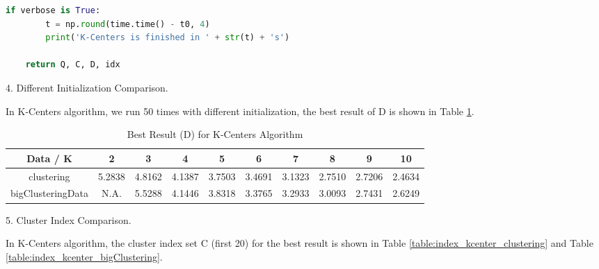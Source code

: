 \begin{description}
\begin{description}
\begin{lstlisting}[language=Python, caption=K-Centers Algorithm Python Code]
    if verbose is True:
        t = np.round(time.time() - t0, 4)
        print('K-Centers is finished in ' + str(t) + 's')

    return Q, C, D, idx
\end{lstlisting}

\item{4.} Different Initialization Comparison.

In K-Centers algorithm, we run 50 times with different initialization, the best result of D is shown in Table \ref{table:best_kcenter}.

\begin{table}[H]
	\centering
	\caption{Best Result (D) for K-Centers Algorithm}
	\label{table:best_kcenter}	
	\begin{tabular}{ c | c | c | c | c | c | c | c | c | c}
		\hline \hline
		Data / K      & 2     &    3    & 4    & 5     & 6    & 7    & 8   & 9    & 10 \\[0.1cm]
		\hline
	clustering	        & 5.2838 &    4.8162 & 4.1387 & 3.7503 & 3.4691 & 3.1323 & 2.7510 & 2.7206 & 2.4634 \\[0.1cm]
bigClusteringData & N.A. &    5.5288 & 4.1446 & 3.8318 & 3.3765 & 3.2933 & 3.0093 & 2.7431 & 2.6249 \\[0.1cm]
		\hline	
	\end{tabular}
\end{table}

\item{5.} Cluster Index Comparison.

In K-Centers algorithm, the cluster index set C (first 20) for the best result is shown in Table \ref{table:index_kcenter_clustering} and Table \ref{table:index_kcenter_bigClustering}.


\end{description}
\end{description}
